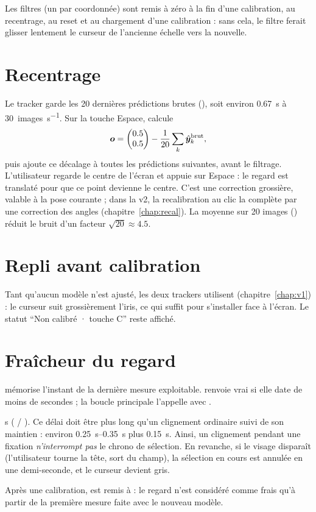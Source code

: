 Les filtres (un par coordonnée) sont remis à zéro à la fin d'une calibration, au recentrage, au reset et au chargement d'une calibration : sans cela, le filtre ferait glisser lentement le curseur de l'ancienne échelle vers la nouvelle.

\section{Recentrage}

Le tracker garde les 20 dernières prédictions brutes (), soit environ \qty{0.67}{\second} à \qty{30}{images\per\second}. Sur la touche Espace,  calcule
\begin{equation}
  \bm{o} = \begin{pmatrix}0.5\\0.5\end{pmatrix} - \frac{1}{20}\sum_{k} \hat{\bm{y}}^\text{brut}_k ,
\end{equation}
puis ajoute ce décalage à toutes les prédictions suivantes, avant le filtrage. L'utilisateur regarde le centre de l'écran et appuie sur Espace : le regard est translaté pour que ce point devienne le centre. C'est une correction grossière, valable à la pose courante ; dans la v2, la recalibration au clic la complète par une correction des angles (chapitre~\ref{chap:recal}). La moyenne sur 20 images (\empi) réduit le bruit d'un facteur $\sqrt{20} \approx 4.5$.

\section{Repli avant calibration}

Tant qu'aucun modèle n'est ajusté, les deux trackers utilisent  (chapitre~\ref{chap:v1}) : le curseur suit grossièrement l'iris, ce qui suffit pour s'installer face à l'écran. Le statut \enquote{Non calibré · touche C} reste affiché.

\section{Fraîcheur du regard}

 mémorise l'instant de la dernière mesure exploitable.  renvoie vrai si elle date de moins de  secondes ; la boucle principale l'appelle avec .

\begin{origine}
 s (\deriv{} / \empi). Ce délai doit être plus long qu'un clignement ordinaire suivi de son maintien : environ \qtyrange{0.25}{0.35}{\second} plus \qty{0.15}{\second}. Ainsi, un clignement pendant une fixation \emph{n'interrompt pas} le chrono de sélection. En revanche, si le visage disparaît (l'utilisateur tourne la tête, sort du champ), la sélection en cours est annulée en une demi-seconde, et le curseur devient gris.
\end{origine}

Après une calibration,  est remis à  : le regard n'est considéré comme frais qu'à partir de la première mesure faite avec le nouveau modèle.

